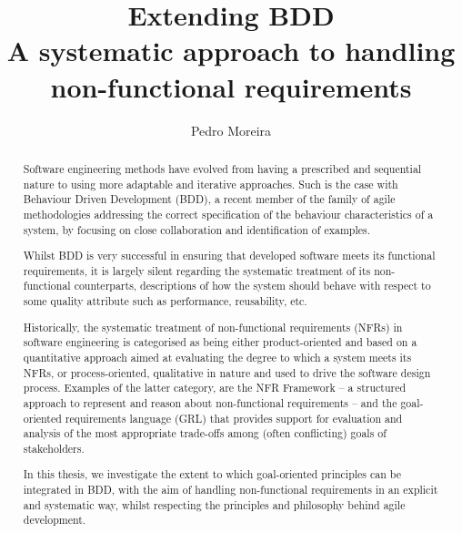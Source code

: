 \documentclass[dissertation,final]{softeng}
\title{Extending BDD\\A systematic approach to handling non-functional requirements}
\author{Pedro Moreira}
\begin{document}
\expandafter\def\csname PY@tok@err\endcsname{}
\maketitle


\begin{abstract}
Software engineering methods have evolved from having a prescribed and sequential nature to using more adaptable and iterative approaches. Such is the case with Behaviour Driven Development (BDD), a recent member of the family of agile methodologies addressing the correct specification of the behaviour characteristics of a system, by focusing on close collaboration and identification of examples.

Whilst BDD is very successful in ensuring that developed software meets its functional requirements, it is largely silent regarding the systematic treatment of its non-functional counterparts, descriptions of how the system should behave with respect to some quality attribute such as performance, reusability, etc.

Historically, the systematic treatment of non-functional requirements (NFRs) in software engineering is categorised as being either product-oriented and based on a quantitative approach aimed at evaluating the degree to which a system meets its NFRs, or process-oriented, qualitative in nature and used to drive the software design process. Examples of the latter category, are the NFR Framework -- a structured approach to represent and reason about non-functional requirements -- and the goal-oriented requirements language (GRL) that provides support for evaluation and analysis of the most appropriate trade-offs among (often conflicting) goals of stakeholders. 

In this thesis, we investigate the extent to which goal-oriented principles can be integrated in BDD, with the aim of handling non-functional requirements in an explicit and systematic way, whilst respecting the principles and philosophy behind agile development.
\end{abstract}

\clearpage

\begin{acknowledgements}
\end{acknowledgements}
\end{document}

